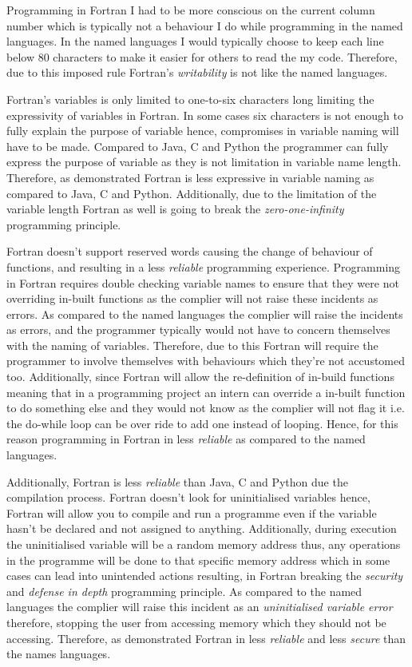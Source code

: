 \documentclass[
	12pt, %
]{fphw}
\begin{document}
Programming in Fortran I had to be more conscious on the current column number
which is typically not a behaviour I do while programming in the named languages.
In the named languages I would typically choose to keep each line below 80 characters
to make it easier for others to read the my code. Therefore, due to this imposed
rule Fortran's \emph{writability} is not like the named languages. \par

Fortran's variables is only limited to one-to-six characters long limiting the
expressivity of variables in Fortran. In some cases six characters is not enough
to fully explain the purpose of variable hence, compromises in variable naming
will have to be made. Compared to Java, C and Python the programmer can fully
express the purpose of variable as they is not limitation in variable name
length. Therefore, as demonstrated Fortran is less expressive in variable naming
as compared to Java, C and Python. Additionally, due to the limitation of the
variable length Fortran as well is going to break the \emph{zero-one-infinity}
programming principle. \par

Fortran doesn't support reserved words causing the change of behaviour of functions,
and resulting in a less \emph{reliable} programming experience. Programming in
Fortran requires double checking variable names to ensure that they were not
overriding in-built functions as the complier will not raise these incidents as
errors. As compared to the named languages the complier will raise the incidents
as errors, and the programmer typically would not have to concern themselves
with the naming of variables. Therefore, due to this Fortran will require the
programmer to involve themselves with behaviours which they're not accustomed too.
Additionally, since Fortran will allow the re-definition of in-build functions
meaning that in a programming project an intern can override a in-built function
to do something else and they would not know as the complier will not flag it i.e.
the do-while loop can be over ride to add one instead of looping. Hence, for this
reason programming in Fortran in less \emph{reliable} as compared to the named
languages.\par

Additionally, Fortran is less \emph{reliable} than Java, C and Python due the compilation
process. Fortran doesn't look for uninitialised variables hence, Fortran will
allow you to compile and run a programme even if the variable hasn't be declared
and not assigned to anything. Additionally, during execution the uninitialised
variable will be a random memory address thus, any operations in the programme
will be done to that specific memory address which in some cases can lead into
unintended actions resulting, in Fortran breaking the \emph{security} and
\emph{defense in depth} programming principle. As compared to the named languages
the complier will raise this incident as an \emph{uninitialised variable error}
therefore, stopping the user from accessing memory which they should not be accessing.
Therefore, as demonstrated Fortran in less \emph{reliable} and less \emph{secure}
than the names languages.\par
\end{document}
